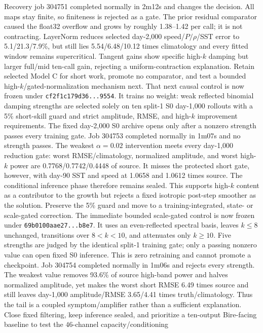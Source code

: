 \documentclass[11pt]{article}
\begin{document}
{Recovery job 304751 completed normally in 2m12s and changes the decision.
All maps stay finite, so finiteness is rejected as a gate.  The prior
residual comparator caused the float32 overflow and grows by roughly
1.38--1.42 per call; it is not contracting.  LayerNorm reduces selected
day-2,000 speed/\(P/\rho\)/SST error to 5.1/21.3/7.9\%, but still lies
5.54/6.48/10.12 times climatology and every fitted window remains
supercritical.  Tangent gains show specific high-\(k\) damping but larger
full/mid ten-call gain, rejecting a uniform-contraction explanation.
Retain selected Model C for short work, promote no comparator, and test a
bounded high-\(k\)/gated-normalization mechanism next.
That next causal control is now frozen under
\texttt{cf2f1c179d36...9554}.  It trains no weight: weak reflected
binomial damping strengths are selected solely on ten split-1 S0
day-1,000 rollouts with a 5\% short-skill guard and strict amplitude,
RMSE, and high-\(k\) improvement requirements.  The fixed day-2,000 S0
archive opens only after a nonzero strength passes every training gate.
Job 304753 completed normally in 1m07s and no strength passes.  The weakest
\(\alpha=0.02\) intervention meets every day-1,000 reduction gate:
worst RMSE/climatology, normalized amplitude, and worst high-\(k\) power
are 0.7768/0.7742/0.4448 of source.  It misses the protected short gate,
however, with day-90 SST and speed at 1.0658 and 1.0612 times source.
The conditional inference phase therefore remains sealed.  This supports
high-\(k\) content as a contributor to the growth but rejects a fixed
isotropic post-step smoother as the solution.  Preserve the 5\% guard and
move to a training-integrated, state- or scale-gated correction.
The immediate bounded scale-gated control is now frozen under
\texttt{69b0100aae27...b8e7}.  It uses an even-reflected spectral basis,
leaves \(k\leq8\) unchanged, transitions over \(8<k<10\), and attenuates
only \(k\geq10\).  Five strengths are judged by the identical split-1
training gate; only a passing nonzero value can open fixed S0 inference.
This is zero retraining and cannot promote a checkpoint.
Job 304754 completed normally in 1m06s and rejects every strength.  The
weakest value removes 93.6\% of source high-band power and halves normalized
amplitude, yet makes the worst short RMSE 6.49 times source and still leaves
day-1,000 amplitude/RMSE 3.65/4.41 times truth/climatology.  Thus the tail is
a coupled symptom/amplifier rather than a sufficient explanation.  Close
fixed filtering, keep inference sealed, and prioritize a ten-output
Bire-facing baseline to test the \(46\)-channel capacity/conditioning
}
\end{document}
